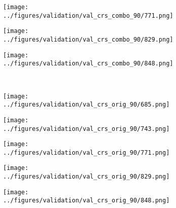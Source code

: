 \begin{figure}[h!]
	\begin{subfigure}{0.18\textwidth}
		\centering
		\texttt{[image: ../figures/validation/val\_crs\_combo\_90/771.png]}
		\label{fig:1}
	\end{subfigure}
	\begin{subfigure}{0.18\textwidth}
		\centering
		\texttt{[image: ../figures/validation/val\_crs\_combo\_90/829.png]}
		\label{fig:1}
	\end{subfigure}
	\begin{subfigure}{0.18\textwidth}
		\centering
		\texttt{[image: ../figures/validation/val\_crs\_combo\_90/848.png]}
		\label{fig:1}
	\end{subfigure}
	\vspace{-0.35cm}
	\\
		\begin{subfigure}[b]{0.03\textwidth} %
		\centering
	\end{subfigure}
	\hspace{0.05cm}
	\begin{subfigure}{0.18\textwidth}
		\centering
		\texttt{[image: ../figures/validation/val\_crs\_orig\_90/685.png]}
		\label{fig:1}
	\end{subfigure}
	\begin{subfigure}{0.18\textwidth}
		\centering
		\texttt{[image: ../figures/validation/val\_crs\_orig\_90/743.png]}
		\label{fig:1}
	\end{subfigure}
	\begin{subfigure}{0.18\textwidth}
		\centering
		\texttt{[image: ../figures/validation/val\_crs\_orig\_90/771.png]}
		\label{fig:1}
	\end{subfigure}
	\begin{subfigure}{0.18\textwidth}
		\centering
		\texttt{[image: ../figures/validation/val\_crs\_orig\_90/829.png]}
		\label{fig:1}
	\end{subfigure}
	\begin{subfigure}{0.18\textwidth}
		\centering
		\texttt{[image: ../figures/validation/val\_crs\_orig\_90/848.png]}
		\label{fig:1}
	\end{subfigure}
		\vspace{-0.35cm}
	\\
	\begin{subfigure}[b]{0.03\textwidth} %

\end{subfigure}
\end{figure}
